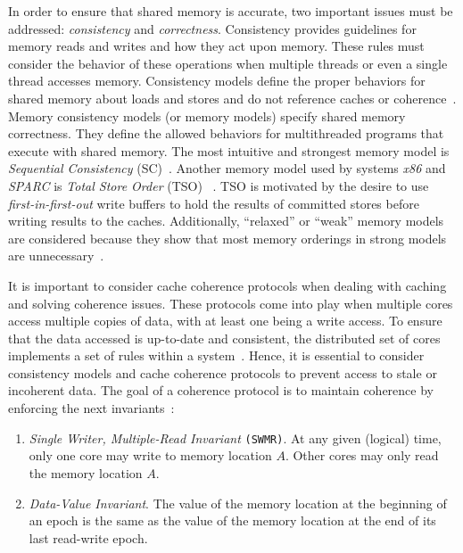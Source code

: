 In order to ensure that shared memory is accurate, two important issues must be addressed: \emph{consistency} and \emph{correctness}. Consistency provides guidelines for memory reads and writes and how they act upon memory. These rules must consider the behavior of these operations when multiple threads or even a single thread accesses memory. Consistency models define the proper behaviors for shared memory about loads and stores and do not reference caches or coherence~\cite{DBLP_series_synthesis_2020Nagarajan}. Memory consistency models (or memory models) specify shared memory correctness. They define the allowed behaviors for multithreaded programs that execute with shared memory. The most intuitive and strongest memory model is \emph{Sequential Consistency} (SC)~\cite{lamport1979how}. Another memory model used by systems \emph{x86} and \emph{SPARC} is \emph{Total Store Order} (TSO) ~\cite{DBLP_conf_tphol_OwensSS09, DBLP_journals_cacm_SewellSONM10, sparc1992sparc}. TSO is motivated by the desire to use \emph{first-in-first-out} write buffers to hold the results of committed stores before writing results to the caches. Additionally, ``relaxed'' or ``weak'' memory models are considered because they show that most memory orderings in strong models are unnecessary~\cite{DBLP_series_synthesis_2020Nagarajan}.


It is important to consider cache coherence protocols when dealing with caching and solving coherence issues. These protocols come into play when multiple cores access multiple copies of data, with at least one being a write access. To ensure that the data accessed is up-to-date and consistent, the distributed set of cores implements a set of rules within a system~\cite{DBLP_series_synthesis_2020Nagarajan}. Hence, it is essential to consider consistency models and cache coherence protocols to prevent access to stale or incoherent data. The goal of a coherence protocol is to maintain coherence by enforcing the next invariants~\cite{DBLP_series_synthesis_2020Nagarajan}:

\begin{enumerate}
  \item \emph{Single Writer, Multiple-Read Invariant} \texttt{(SWMR)}. At any given
 (logical) time, only one core may write to memory location \(A\). Other cores may only read the memory location \(A\).

  \item \emph{Data-Value Invariant}. The value of the memory location at the beginning of an epoch is the same as the value of the memory location at the end of its last read-write epoch.
\end{enumerate}


